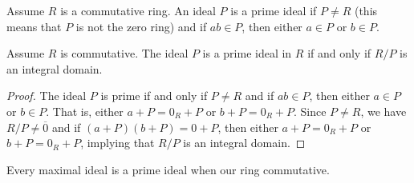 \begin{definition}
    Assume \( R  \) is a commutative ring. An ideal \( P  \) is a prime ideal if \( P \neq R  \) (this means that \( P  \) is not the zero ring) and if \( ab \in P  \), then either \( a \in P  \) or \( b\in P  \).
\end{definition}

\begin{prop}
    Assume \( R  \) is commutative. The ideal \( P  \) is a prime ideal in \( R  \) if and only if \( R /  P \) is an integral domain.
\end{prop}
\begin{proof}
The ideal \( P  \) is prime if and only if \( P \neq R  \) and if \( ab \in P  \), then either \( a \in P  \) or \( b \in P  \). That is, either \( a + P = {0}_{R} + P  \) or \( b + P  = {0}_{R} + P   \). Since \( P \neq R  \), we have \( R /P  \neq \overline{0} \) and if \( (a + P) (b+P) = 0 + P  \), then either \( a + P  = {0}_{R} + P  \) or \( b  + P  = {0}_{R} + P  \), implying that \( R /P  \) is an integral domain. 
\end{proof}


\begin{corollary}
    Every maximal ideal is a prime ideal when our ring commutative.
\end{corollary}

